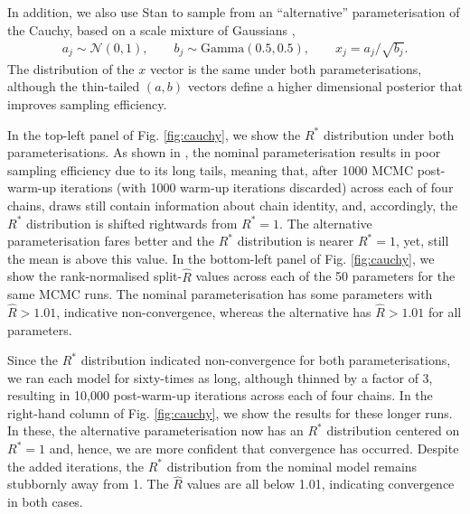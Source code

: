 \documentclass{article}
\newcommand{\N}{\mathcal{N}}
\begin{document}
In addition, we also use Stan to sample from an ``alternative'' parameterisation of the Cauchy, based on a scale mixture of Gaussians \citep{vehtari2019rank},
%
\begin{align}
a_j \sim  \N(0,1), \qquad
b_j \sim  \text{Gamma}(0.5, 0.5), \qquad
x_j =  a_j/\sqrt{b_j}.
\end{align}
%
The distribution of the $x$ vector is the same under both parameterisations, although the thin-tailed $(a,b)$ vectors define a higher dimensional posterior that improves sampling efficiency.

In the top-left panel of Fig. \ref{fig:cauchy}, we show the $R^*$ distribution under both parameterisations. As shown in \cite{vehtari2019rank}, the nominal parameterisation results in poor sampling efficiency due to its long tails, meaning that, after 1000 MCMC post-warm-up iterations (with 1000 warm-up iterations discarded) across each of four chains, draws still contain information about chain identity, and, accordingly, the $R^*$ distribution is shifted rightwards from $R^*=1$. The alternative parameterisation fares better and the $R^*$ distribution is nearer $R^*=1$, yet, still the mean is above this value. In the bottom-left panel of Fig. \ref{fig:cauchy}, we show the rank-normalised split-$\widehat{R}$ values across each of the 50 parameters for the same MCMC runs. The nominal parameterisation has some parameters with $\widehat{R}>1.01$, indicative non-convergence, whereas the alternative has $\widehat{R}>1.01$ for all parameters.

Since the $R^*$ distribution indicated non-convergence for both parameterisations, we ran each model for sixty-times as long, although thinned by a factor of 3, resulting in 10,000 post-warm-up iterations across each of four chains. In the right-hand column of Fig. \ref{fig:cauchy}, we show the results for these longer runs. In these, the alternative parameterisation now has an $R^*$ distribution centered on $R^*=1$ and, hence, we are more confident that convergence has occurred. Despite the added iterations, the $R^*$ distribution from the nominal model remains stubbornly away from 1. The $\widehat{R}$ values are all below 1.01, indicating convergence in both cases.
\end{document}
